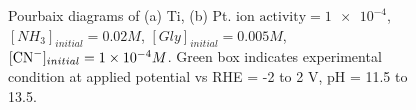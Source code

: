 \documentclass[journal=jacsat,manuscript=article]{achemso}
\begin{document}
\begin{figure}[htbp]
\begin{subfigure}[b]{0.45\textwidth}
        \par\medskip   
    \end{subfigure}
    \caption{Pourbaix diagrams of (a) Ti, (b) Pt. $\text{ion activity}=\num{1e-4}$, $[NH_3]_{initial}= 0.02M$, $[Gly]_{initial}=0.005M$, $[\ce{CN-}]_{initial}=\num{1e-4}M$. Green box indicates experimental condition at applied potential vs RHE = -2 to 2 V, pH = 11.5 to 13.5.}
    \label{fig:Ti_Pt_Pourbaix}
\end{figure}

\end{document}
